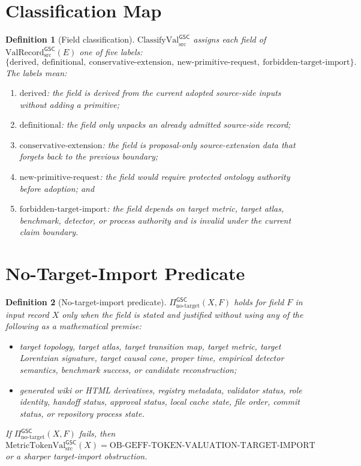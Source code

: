 \documentclass[11pt]{article}
\newcommand{\MetricTokenVal}{\mathrm{MetricTokenVal}_{\mathrm{src}}^{\mathsf{GSC}}}
\newcommand{\ValRecord}{\mathrm{ValRecord}_{\mathrm{src}}^{\mathsf{GSC}}}
\newcommand{\ClassVal}{\mathrm{ClassifyVal}_{\mathrm{src}}^{\mathsf{GSC}}}
\newcommand{\NoTarget}{\Pi_{\mathrm{no\mbox{-}target}}^{\mathsf{GSC}}}
\newtheorem{definition}{Definition}
\begin{document}
\section{Classification Map}

\begin{definition}[Field classification]
\(\ClassVal\) assigns each field of \(\ValRecord(E)\) one of five labels:
\[
\{\mathrm{derived},\ \mathrm{definitional},\
\mathrm{conservative\mbox{-}extension},\ \mathrm{new\mbox{-}primitive\mbox{-}request},\
\mathrm{forbidden\mbox{-}target\mbox{-}import}\}.
\]
The labels mean:
\begin{enumerate}[leftmargin=*]
  \item \(\mathrm{derived}\): the field is derived from the current adopted
  source-side inputs without adding a primitive;
  \item \(\mathrm{definitional}\): the field only unpacks an already admitted
  source-side record;
  \item \(\mathrm{conservative\mbox{-}extension}\): the field is proposal-only
  source-extension data that forgets back to the previous boundary;
  \item \(\mathrm{new\mbox{-}primitive\mbox{-}request}\): the field would
  require protected ontology authority before adoption; and
  \item \(\mathrm{forbidden\mbox{-}target\mbox{-}import}\): the field depends
  on target metric, target atlas, benchmark, detector, or process authority
  and is invalid under the current claim boundary.
\end{enumerate}
\end{definition}

\section{No-Target-Import Predicate}

\begin{definition}[No-target-import predicate]
\(\NoTarget(X,F)\) holds for field \(F\) in input record \(X\) only when the
field is stated and justified without using any of the following as a
mathematical premise:
\begin{itemize}[leftmargin=*]
  \item target topology, target atlas, target transition map, target metric,
  target Lorentzian signature, target causal cone, proper time, empirical
  detector semantics, benchmark success, or candidate reconstruction;
  \item generated wiki or HTML derivatives, registry metadata, validator
  status, role identity, handoff status, approval status, local cache state,
  file order, commit status, or repository process state.
\end{itemize}
If \(\NoTarget(X,F)\) fails, then
\[
  \MetricTokenVal(X)
  =
  \mathrm{OB\mbox{-}GEFF\mbox{-}TOKEN\mbox{-}VALUATION\mbox{-}TARGET\mbox{-}IMPORT}
\]
or a sharper target-import obstruction.
\end{definition}
\end{document}
